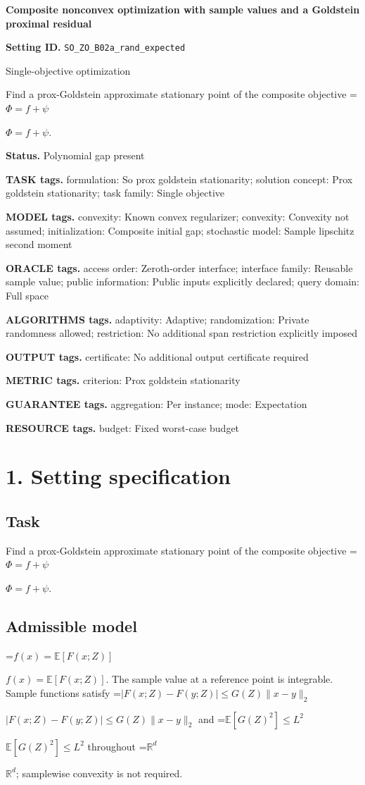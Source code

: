 \documentclass[10pt,a4paper]{article}
\newcommand{\AtlasMath}[1]{\par\begingroup\centering\setbox0=\hbox{$\displaystyle #1$}\ifdim\wd0>1.4\linewidth\typeout{ATLAS WIDE FORMULA: \the\wd0}\fi\ifdim\wd0>\linewidth\resizebox{\linewidth}{!}{\box0}\else\box0\fi\par\endgroup}
\newcommand{\AtlasInlineMath}[1]{\begingroup\setbox0=\hbox{$#1$}\ifdim\wd0>.4\linewidth\endgroup\AtlasMath{#1}\else\endgroup$#1$\fi}
\begin{document}
\raggedright

{\LARGE\bfseries\sffamily\color{AtlasNavy} Composite nonconvex optimization with sample values and a Goldstein proximal residual\par}\vspace{5pt}
\textbf{Setting ID.} \texttt{SO\_\allowbreak{}ZO\_\allowbreak{}B02a\_\allowbreak{}rand\_\allowbreak{}expected}

Single-objective optimization

Find a prox-Goldstein approximate stationary point of the composite objective \AtlasInlineMath{\Phi=f+\psi}.

\textbf{Status.} Polynomial gap present

\textbf{TASK tags.} formulation: So prox goldstein stationarity; solution concept: Prox goldstein stationarity; task family: Single objective

\textbf{MODEL tags.} convexity: Known convex regularizer; convexity: Convexity not assumed; initialization: Composite initial gap; stochastic model: Sample lipschitz second moment

\textbf{ORACLE tags.} access order: Zeroth-order interface; interface family: Reusable sample value; public information: Public inputs explicitly declared; query domain: Full space

\textbf{ALGORITHMS tags.} adaptivity: Adaptive; randomization: Private randomness allowed; restriction: No additional span restriction explicitly imposed

\textbf{OUTPUT tags.} certificate: No additional output certificate required

\textbf{METRIC tags.} criterion: Prox goldstein stationarity

\textbf{GUARANTEE tags.} aggregation: Per instance; mode: Expectation

\textbf{RESOURCE tags.} budget: Fixed worst-case budget

\section{1. Setting specification}
\subsection{Task}
Find a prox-Goldstein approximate stationary point of the composite objective \AtlasInlineMath{\Phi=f+\psi}.

\subsection{Admissible model}
\AtlasInlineMath{f(x)=\mathbb{E}[F(x;Z)]}. The sample value at a reference point is integrable. Sample functions satisfy \AtlasInlineMath{|F(x;Z)-F(y;Z)|\le G(Z)\|x-y\|_2} and \AtlasInlineMath{\mathbb{E}[G(Z)^2]\le L^2} throughout \AtlasInlineMath{\mathbb{R}^d}; samplewise convexity is not required.
\end{document}
